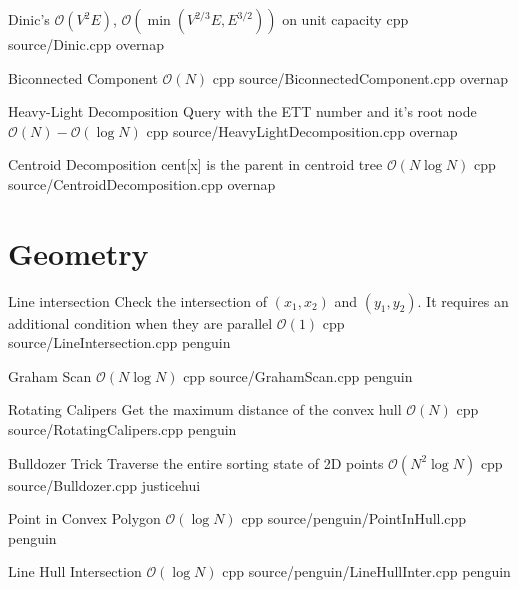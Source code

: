 \documentclass[landscape, 10pt, a4paper, oneside, twocolumn]{extarticle}
\begin{document}

\Algorithm
{Dinic's}
{}
{$\mathcal{O}(V^2E)$, $\mathcal{O}(\min{(V^{2/3}E,E^{3/2})})$ on unit capacity}
{cpp}
{source/Dinic.cpp}
{overnap}



\Algorithm
{Biconnected Component}
{}
{$\mathcal{O}(N)$}
{cpp}
{source/BiconnectedComponent.cpp}
{overnap}


\Algorithm
{Heavy-Light Decomposition}
{Query with the ETT number and it's root node}
{$\mathcal{O}(N)-\mathcal{O}(\log{N})$}
{cpp}
{source/HeavyLightDecomposition.cpp}
{overnap}

\Algorithm
{Centroid Decomposition}
{cent[x] is the parent in centroid tree}
{$\mathcal{O}(N\log{N})$}
{cpp}
{source/CentroidDecomposition.cpp}
{overnap}


\section{Geometry}

\Algorithm
{Line intersection}
{Check the intersection of $(x_1, x_2)$ and $(y_1, y_2)$. It requires an additional condition when they are parallel}
{$\mathcal{O}(1)$}
{cpp}
{source/LineIntersection.cpp}
{penguin}

\Algorithm
{Graham Scan}
{}
{$\mathcal{O}(N\log{N})$}
{cpp}
{source/GrahamScan.cpp}
{penguin}

\Algorithm
{Rotating Calipers}
{Get the maximum distance of the convex hull}
{$\mathcal{O}(N)$}
{cpp}
{source/RotatingCalipers.cpp}
{penguin}

\Algorithm
{Bulldozer Trick}
{Traverse the entire sorting state of 2D points}
{$\mathcal{O}(N^2\log{N})$}
{cpp}
{source/Bulldozer.cpp}
{justicehui}

\Algorithm
{Point in Convex Polygon}
{}
{$\mathcal{O}(\log{N})$}
{cpp}
{source/penguin/PointInHull.cpp}
{penguin}

\Algorithm
{Line Hull Intersection}
{}
{$\mathcal{O}(\log{N})$}
{cpp}
{source/penguin/LineHullInter.cpp}
{penguin}
\end{document}
